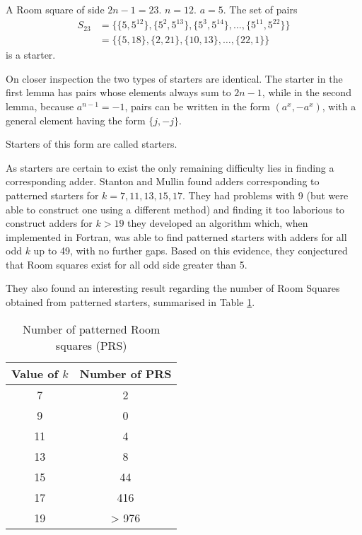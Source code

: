 \begin{example}
A Room square of side $2n - 1 = 23$. $n = 12$. $a = 5$.
The set of pairs
\begin{equation*}
\begin{split}
S_{23} &= \{\{5, 5^{12}\}, \{5^2, 5^{13}\}, \{5^3, 5^{14}\}, \ldots, \{5^{11}, 5^{22}\}\} \\
       &= \{\{5, 18\}, \{2, 21\}, \{10, 13\}, \ldots, \{22, 1\}\}
\end{split}
\end{equation*}
is a starter.
\end{example}

On closer inspection the two types of starters are identical.
The starter in the first lemma has pairs whose elements always sum to $2n - 1$, while in the second lemma, because $a^{n - 1} = -1$, pairs can be written in the form $(a^{x}, -a^{x})$, with a general element having the form $\{j, -j\}$.

Starters of this form are called  starters.

As starters are certain to exist the only remaining difficulty lies in finding a corresponding adder.
Stanton and Mullin found adders corresponding to patterned starters for $k = 7, 11, 13, 15, 17$.
They had problems with 9 (but were able to construct one using a different method) and finding it too laborious to construct adders for $k > 19$ they developed an algorithm which, when implemented in Fortran, was able to find patterned starters with adders for all odd $k$ up to 49, with no further gaps.
Based on this evidence, they conjectured that Room squares exist for all odd side greater than 5.

They also found an interesting result regarding the number of Room Squares obtained from patterned starters, summarised in Table \ref{tab:patterned}. 

\begin{table}[h!]
  \begin{center}
    \begin{tabular}{c|c}
    Value of $k$ & Number of PRS \\ \hline
               7 &      2        \\
               9 &      0        \\
              11 &      4        \\
              13 &      8        \\
              15 &     44        \\
              17 &    416        \\
              19 &  > 976
    \end{tabular}
  \end{center}
  \caption{Number of patterned Room squares (PRS)}
  \label{tab:patterned}
\end{table}

